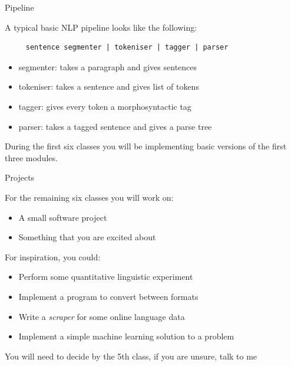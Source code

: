 \documentclass[10pt, compress]{beamer}
\begin{document}
\begin{frame}[fragile]{Pipeline}
 
A typical basic NLP pipeline looks like the following:

\begin{verbatim}
     sentence segmenter | tokeniser | tagger | parser
\end{verbatim}

\begin{itemize}
  \item segmenter: takes a paragraph and gives sentences
  \item tokeniser: takes a sentence and gives list of tokens
  \item tagger: gives every token a morphosyntactic tag
  \item parser: takes a tagged sentence and gives a parse tree
\end{itemize} 

During the first six classes you will be implementing basic
 versions of the first three modules.

\end{frame}

\begin{frame}{Projects}

For the remaining six classes you will work on:
\begin{itemize}
  \item A small software project
  \item Something that you are excited about
\end{itemize}

For inspiration, you could:
\begin{itemize}
  \item Perform some quantitative linguistic experiment
  \item Implement a program to convert between formats
  \item Write a \emph{scraper} for some online language data
  \item Implement a simple machine learning solution to a problem
\end{itemize}

You will need to decide by the 5th class, if you are unsure, talk to me

\end{frame}
\end{document}
